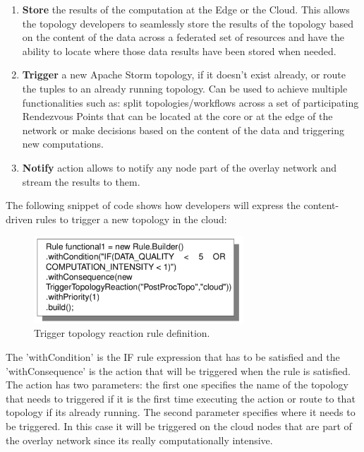 \begin{enumerate}
  \item \textbf{Store} the results of the computation at the Edge or the Cloud. This allows the topology developers to seamlessly store the results of the topology based on the content of the data across a federated set of resources and have the ability to locate where those data results have been stored when needed.
  \item \textbf{Trigger} a new Apache Storm topology, if it doesn't exist already, or route the tuples to an already running topology. Can be used to achieve multiple functionalities such as: split topologies/workflows across a set of participating Rendezvous Points that can be located at the core or at the edge of the network or make decisions based on the content of the data and triggering new computations.
  \item \textbf{Notify} action allows to notify any node part of the overlay network and stream the results to them.
\end{enumerate}


The following snippet of code shows how developers will express the content-driven rules to trigger a new topology in the cloud:

\begin{figure}[h!]
  \centering
  \includegraphics[width=0.7\textwidth]{Figures/RuleTopology.pdf}
  \caption{Trigger topology reaction rule definition.}
  \label{fig:RuleTopology}
\end{figure}


The 'withCondition' is the IF rule expression that has to be satisfied and the 'withConsequence' is the action that will be triggered when the rule is satisfied. The action has two parameters: the first one specifies the name of the topology that needs to triggered if it is the first time executing the action or route to that topology if its already running. The second parameter specifies where it needs to be triggered. In this case it will be triggered on the cloud nodes that are part of the overlay network since its really computationally intensive. 

